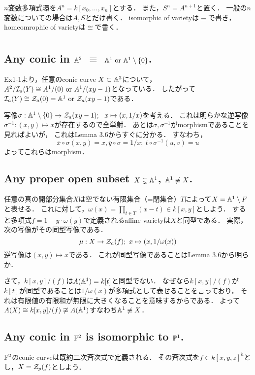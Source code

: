 \documentclass[a4paper]{jsarticle}
\begin{document}
    $n$変数多項式環を$A^n=k[x_0, \dots, x_n]$とする．
    また，$S^n=A^{n+1}$と置く．
    一般の$n$変数についての場合は$A, S$とだけ書く．
    isomorphic of varietyは$\equiv$で書き，homeomrophic of varietyは$\cong$で書く．

\section{ } %
    \subsection{Any conic in $\mathbb{A}^2$ $\equiv$ $\mathbb{A}^1 \text{ or } \mathbb{A}^1 \setminus \{0\}$.}
    Ex1-1より，任意のconic curve $X \subset \mathbb{A}^2$について，
    $A^2/\mathcal{I}_a(Y) \cong A^1/(0) \text{ or } A^1/(xy-1)$となっている．
    したがって$\mathcal{I}_a(Y) \cong \mathcal{Z}_a(0)=\mathbb{A}^1 \text{ or } \mathcal{Z}_a(xy-1)$である．

    写像$\sigma: \mathbb{A}^1 \setminus \{0\} \to \mathcal{Z}_a(xy-1);~~ x \mapsto (x,1/x)$を考える．
    これは明らかな逆写像$\sigma^{-1}: (x,y) \mapsto x$が存在するので全単射．
    あとは$\sigma, \sigma^{-1}$がmorphismであることを見ればよいが，
    これはLemma 3.6からすぐに分かる．
    すなわち，
    \[ \bar{x} \circ \sigma(x,y)=x, \bar{y} \circ \sigma=1/x;~ t \circ \sigma^{-1}(u,v)=u  \]
    よってこれらはmorphism．

    \subsection{Any proper open subset $X \subsetneq \mathbb{A}^1$, $\mathbb{A}^1 \not \equiv X$.}
    任意の真の開部分集合$X$は空でない有限集合（=閉集合）$T$によって$X=\mathbb{A}^1 \setminus F$と表せる．
    これに対して，$\omega(x)=\prod_{t \in T}(x-t) \in k[x,y]$としよう．
    すると多項式$f=1-y \cdot \omega(y)$で定義されるaffine varietyは$X$と同型である．
    実際，次の写像がその同型写像である．
    \[ \mu: X \to \mathcal{Z}_a(f);~ x \mapsto (x, 1/\omega(x)) \]
    逆写像は$(x,y) \mapsto x$である．
    これが同型写像であることはLemma 3.6から明らか．

    さて，$k[x,y]/(f)$は$A(\mathbb{A}^1)=k[t]$と同型でない．
    なぜなら$k[x,y]/(f)$が$k[t]$が同型であることは$1/\omega(x)$が多項式として表せることを言っており，
    それは有限値の有限和が無限に大きくなることを意味するからである．
    よって$A(X) \cong k[x,y]/(f) \not \cong A(\mathbb{A}^1)$すなわち$\mathbb{A}^1 \not \equiv X$．

    \subsection{Any conic in $\mathbb{P}^2$ is isomorphic to $\mathbb{P}^1$.}
    $\mathbb{P}^2$のconic curveは既約二次斉次式で定義される．
    その斉次式を$f \in k[x,y,z]^h$とし，$X=\mathcal{Z}_p(f)$としよう．
\end{document}
